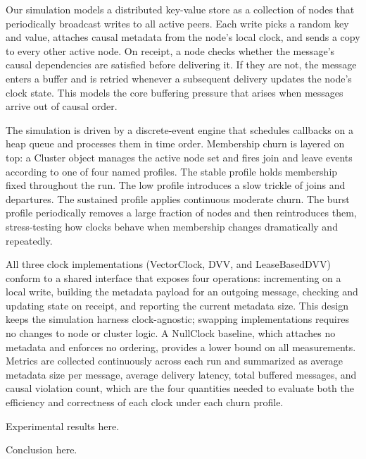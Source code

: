 \documentclass[times, 10pt,twocolumn]{article}
\begin{document}
\vspace{-1em}

\vspace{-1em}

Our simulation models a distributed key-value store as a collection of nodes that periodically broadcast writes to all active peers. Each write picks a random key and value, attaches causal metadata from the node's local clock, and sends a copy to every other active node. On receipt, a node checks whether the message's causal dependencies are satisfied before delivering it. If they are not, the message enters a buffer and is retried whenever a subsequent delivery updates the node's clock state. This models the core buffering pressure that arises when messages arrive out of causal order.

The simulation is driven by a discrete-event engine that schedules callbacks on a heap queue and processes them in time order. Membership churn is layered on top: a Cluster object manages the active node set and fires join and leave events according to one of four named profiles. The stable profile holds membership fixed throughout the run. The low profile introduces a slow trickle of joins and departures. The sustained profile applies continuous moderate churn. The burst profile periodically removes a large fraction of nodes and then reintroduces them, stress-testing how clocks behave when membership changes dramatically and repeatedly.

All three clock implementations (VectorClock, DVV, and LeaseBasedDVV) conform to a shared interface that exposes four operations: incrementing on a local write, building the metadata payload for an outgoing message, checking and updating state on receipt, and reporting the current metadata size. This design keeps the simulation harness clock-agnostic; swapping implementations requires no changes to node or cluster logic. A NullClock baseline, which attaches no metadata and enforces no ordering, provides a lower bound on all measurements. Metrics are collected continuously across each run and summarized as average metadata size per message, average delivery latency, total buffered messages, and causal violation count, which are the four quantities needed to evaluate both the efficiency and correctness of each clock under each churn profile.

\vspace{-1em}

Experimental results here. 

\vspace{-1em}
\vspace{-1em}

Conclusion here. 

\vspace{-1em}


\end{document}
